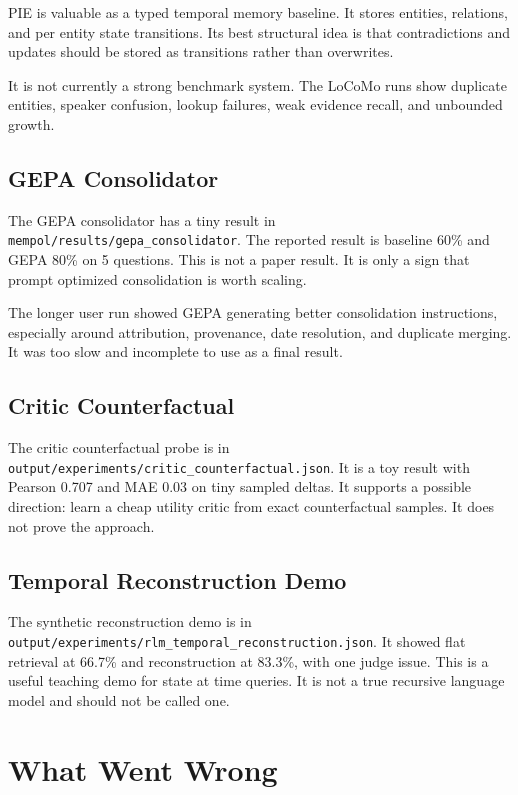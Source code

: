 \documentclass[11pt]{article}
\begin{document}
PIE is valuable as a typed temporal memory baseline. It stores entities, relations, and per entity state transitions. Its best structural idea is that contradictions and updates should be stored as transitions rather than overwrites.

It is not currently a strong benchmark system. The LoCoMo runs show duplicate entities, speaker confusion, lookup failures, weak evidence recall, and unbounded growth.

\subsection{GEPA Consolidator}

The GEPA consolidator has a tiny result in \texttt{mempol/results/gepa\_consolidator}. The reported result is baseline 60\% and GEPA 80\% on 5 questions. This is not a paper result. It is only a sign that prompt optimized consolidation is worth scaling.

The longer user run showed GEPA generating better consolidation instructions, especially around attribution, provenance, date resolution, and duplicate merging. It was too slow and incomplete to use as a final result.

\subsection{Critic Counterfactual}

The critic counterfactual probe is in \texttt{output/experiments/critic\_counterfactual.json}. It is a toy result with Pearson 0.707 and MAE 0.03 on tiny sampled deltas. It supports a possible direction: learn a cheap utility critic from exact counterfactual samples. It does not prove the approach.

\subsection{Temporal Reconstruction Demo}

The synthetic reconstruction demo is in \texttt{output/experiments/rlm\_temporal\_reconstruction.json}. It showed flat retrieval at 66.7\% and reconstruction at 83.3\%, with one judge issue. This is a useful teaching demo for state at time queries. It is not a true recursive language model and should not be called one.

\section{What Went Wrong}
\end{document}
